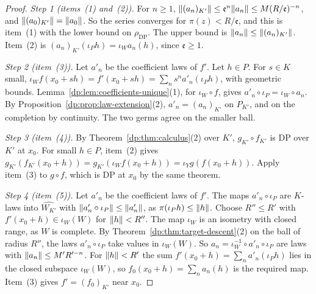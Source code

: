 \begin{proof}
\emph{Step 1 (items~(1) and~(2)).} For $n\ge1$, $\lVert (a_n)_{K'}\rVert\le\mathfrak e^n\lVert a_n\rVert\le M(R/\mathfrak e)^{-n}$, and $\lVert (a_0)_{K'}\rVert=\lVert a_0\rVert$. So the series converges for $\pi(z)<R/\mathfrak e$, and this is item~(1) with the lower bound on $\rho_{\mathrm{DP}}$. The upper bound is $\lVert a_n\rVert\le\lVert (a_n)_{K'}\rVert$. Item~(2) is $(a_n)_{K'}(\iota_Ph)=\iota_Wa_n(h)$, since $\mathfrak e\ge1$.

\emph{Step 2 (item~(3)).} Let $a'_n$ be the coefficient laws of $f'$. Let $h\in P$. For $s\in K$ small, $\iota_Wf(x_0+sh)=f'(x_0+sh)=\sum_ns^na'_n(\iota_Ph)$, with geometric bounds. Lemma~\ref{dp:lem:coefficients-unique}(1), for $\iota_W\circ f$, gives $a'_n\circ\iota_P=\iota_W\circ a_n$. By Proposition~\ref{dp:prop:law-extension}(2), $a'_n=(a_n)_{K'}$ on $P_{K'}$, and on the completion by continuity. The two germs agree on the smaller ball.

\emph{Step 3 (item~(4)).} By Theorem~\ref{dp:thm:calculus}(2) over $K'$, $g_{K'}\circ f_{K'}$ is DP over $K'$ at $x_0$. For small $h\in P$, item~(2) gives $g_{K'}(f_{K'}(x_0+h))=g_{K'}(\iota_Wf(x_0+h))=\iota_Yg(f(x_0+h))$. Apply item~(3) to $g\circ f$, which is DP at $x_0$ by the same theorem.

\emph{Step 4 (item~(5)).} Let $a'_n$ be the coefficient laws of $f'$. The maps $a'_n\circ\iota_P$ are $K$-laws into $\widehat{W_{K'}}$ with $\lVert a'_n\circ\iota_P\rVert\le\lVert a'_n\rVert$, as $\pi(\iota_Ph)\le\lVert h\rVert$. Choose $R''\le R'$ with $f'(x_0+h)\in\iota_W(W)$ for $\lVert h\rVert<R''$. The map $\iota_W$ is an isometry with closed range, as $W$ is complete. By Theorem~\ref{dp:thm:target-descent}(2) on the ball of radius $R''$, the laws $a'_n\circ\iota_P$ take values in $\iota_W(W)$. So $a_n=\iota_W^{-1}\circ a'_n\circ\iota_P$ are laws with $\lVert a_n\rVert\le M'R'^{-n}$. For $\lVert h\rVert<R'$ the sum $f'(x_0+h)=\sum_na'_n(\iota_Ph)$ lies in the closed subspace $\iota_W(W)$, so $f_0(x_0+h)=\sum_na_n(h)$ is the required map. Item~(3) gives $f'=(f_0)_{K'}$ near $x_0$.
\end{proof}


